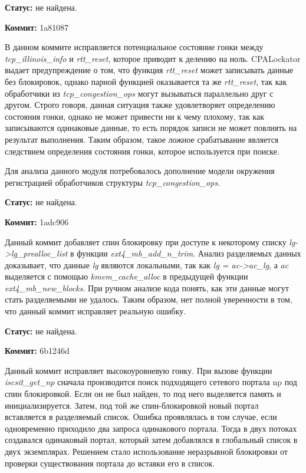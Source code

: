 \textbf{Статус:} не найдена.

\vspace{1cm}

\textbf{Коммит:} 1a81087

В данном коммите исправляется потенциальное состояние гонки между \textit{tcp\_illinois\_info} и \textit{rtt\_reset}, которое приводит к делению на ноль.
CPALockator выдает предупреждение о том, что функция \textit{rtt\_reset} может записывать данные без блокировок, однако парной функцией оказывается та же \textit{rtt\_reset}, так как обработчики из \textit{tcp\_congestion\_ops} могут вызываться параллельно друг с другом.
Строго говоря, данная ситуация также удовлетворяет определению состояния гонки, однако не может привести ни к чему плохому, так как записываются одинаковые данные, то есть порядок записи не может повлиять на результат выполнения.
Таким образом, такое ложное срабатывание является следствием определения состояния гонки, которое используется при поиске. 

Для анализа данного модуля потребовалось дополнение модели окружения регистрацией обработчиков структуры \textit{tcp\_congestion\_ops}.

\textbf{Статус:} не найдена.

\vspace{1cm}

\textbf{Коммит:} 1adc906

Данный коммит добавляет спин блокировку при доступе к некоторому списку \textit{lg->lg\_prealloc\_list} в функции \textit{ext4\_mb\_add\_n\_trim}.
Анализ разделяемых данных доказывает, что данные \textit{lg} являются локальными, так как \textit{lg = ac->ac\_lg}, а \textit{ac} выделяется с помощью \textit{kmem\_cache\_alloc} в предыдущей функции \textit{ext4\_mb\_new\_blocks}. 
При ручном анализе кода понять, как эти данные могут стать разделяемыми не удалось.
Таким образом, нет полной уверенности в том, что данный коммит исправляет реальную ошибку.

\textbf{Статус:} не найдена.

\vspace{1cm}

\textbf{Коммит:} 6b1246d

Данный коммит исправляет высокоуровневую гонку.
При вызове функции \textit{iscsit\_get\_np} сначала производится поиск подходящего сетевого портала np под спин блокировкой.
Если он не был найден, то под него выделяется память и инициализируется.
Затем, под той же спин-блокировкой новый портал вставляется в разделяемый список.
Ошибка проявлялась в том случае, если одновременно приходило два запроса одинакового портала.
Тогда в двух потоках создавался одинаковый портал, который затем добавлялся в глобальный список в двух экземплярах.
Решением стало использование неразрывной блокировки от проверки существования портала до вставки его в список.

